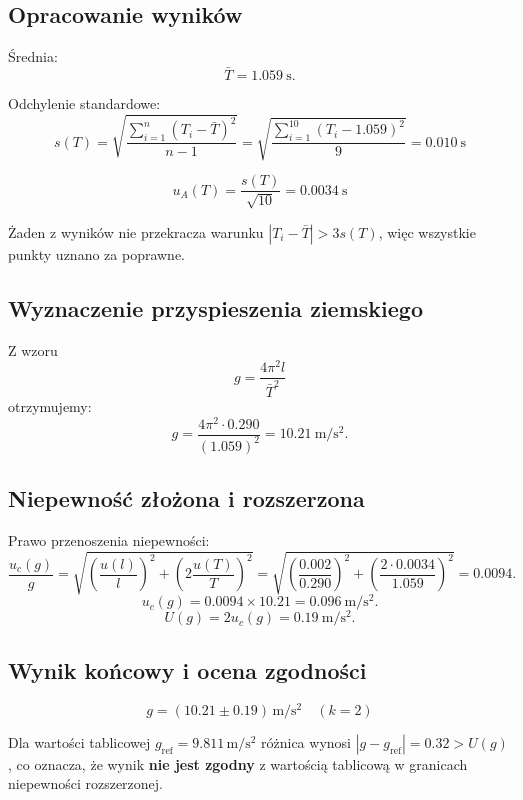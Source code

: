 \documentclass{fizykalab}
\begin{document}
\subsection{Opracowanie wyników}

Średnia:
\[
  \bar{T} = \SI{1.059}{\second}.
\]

Odchylenie standardowe:
\[
  s(T) = \sqrt{\frac{\sum_{i=1}^{n}
  \left(T_i - \bar{T}\right)^2}{n-1}} =
  \sqrt{\frac{\sum_{i=1}^{10}
  \left(T_i - 1.059\right)^2}{9}} = \SI{0.010}{\second}
\]

\[
  u_A(T) = \frac{s(T)}{\sqrt{10}} = \SI{0.0034}{\second}
\]

Żaden z wyników nie przekracza warunku \(|T_i - \bar{T}| > 3s(T)\),
więc wszystkie punkty uznano za poprawne.

\subsection{Wyznaczenie przyspieszenia ziemskiego}

Z wzoru
\[
  g = \frac{4\pi^2 l}{\bar{T}^2}
\]
otrzymujemy:
\[
  g = \frac{4\pi^2 \cdot 0.290}{(1.059)^2}
  = \SI{10.21}{\meter\per\second\squared}.
\]

\subsection{Niepewność złożona i rozszerzona}

Prawo przenoszenia niepewności:
\[
  \frac{u_c(g)}{g} =
  \sqrt{
    \left(\frac{u(l)}{l}\right)^2 +
    \left(2\frac{u(T)}{T}\right)^2
  }
  =
  \sqrt{
    \left(\frac{0.002}{0.290}\right)^2 +
    \left(\frac{2 \cdot 0.0034}{1.059}\right)^2
  }
  = 0.0094.
\]
\[
  u_c(g) = 0.0094 \times 10.21 = \SI{0.096}{\meter\per\second\squared}.
\]
\[
  U(g) = 2u_c(g) = \SI{0.19}{\meter\per\second\squared}.
\]

\subsection{Wynik końcowy i ocena zgodności}

\[
  \boxed{
    g = (10.21 \pm 0.19)\,
    \si{\meter\per\second\squared}\quad(k=2)
  }
\]

Dla wartości tablicowej \( g_\text{ref} = 9.811\,
\si{\meter\per\second\squared} \) różnica wynosi
\(|g - g_\text{ref}| = 0.32 > U(g)\),
co oznacza, że wynik \textbf{nie jest zgodny} z wartością tablicową w granicach
niepewności rozszerzonej.
\end{document}
